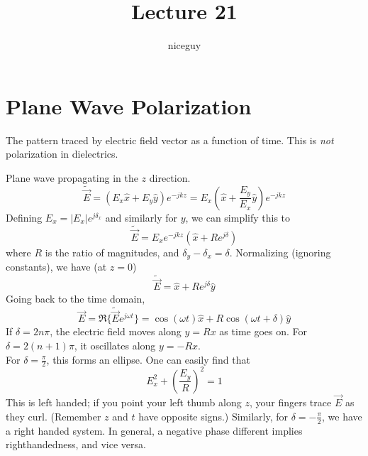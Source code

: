 \documentclass[12pt]{article}
\title{Lecture 21}
\author{niceguy}
\begin{document}
\maketitle

\section{Plane Wave Polarization}

\begin{defn}[Polarization]
    The pattern traced by electric field vector as a function of time. This is \textit{not} polarization in dielectrics.
\end{defn}

\begin{ex}
    Plane wave propagating in the $z$ direction.
    $$\tilde{\vec E} = (E_x\hat x + E_y\hat y)e^{-jkz} = E_x\left(\hat x + \frac{E_y}{E_x}\hat y\right)e^{-jkz}$$
    Defining $E_x = |E_x|e^{j\delta_x}$ and similarly for $y$, we can simplify this to
    $$\tilde{\vec E} = E_xe^{-jkz}\left(\hat x + Re^{j\delta}\right)$$
    where $R$ is the ratio of magnitudes, and $\delta_y - \delta_x = \delta$. Normalizing (ignoring constants), we have (at $z=0$)
    $$\tilde{\vec E} = \hat x + Re^{j\delta}\hat y$$
    Going back to the time domain,
    $$\vec E = \Re\{\tilde{\vec E}e^{j\omega t}\} = \cos(\omega t)\hat x + R\cos(\omega t + \delta)\hat y$$
    If $\delta = 2n\pi$, the electric field moves along $y = Rx$ as time goes on. For $\delta = 2(n+1)\pi$, it oscillates along $y = -Rx$. \\
    For $\delta = \frac{\pi}{2}$, this forms an ellipse. One can easily find that
    $$E_x^2 + \left(\frac{E_y}{R}\right)^2 = 1$$
    This is left handed; if you point your left thumb along $z$, your fingers trace $\vec E$ as they curl. (Remember $z$ and $t$ have opposite signs.) Similarly, for $\delta = -\frac{\pi}{2}$, we have a right handed system. In general, a negative phase different implies righthandedness, and vice versa.
\end{ex}
\end{document}
